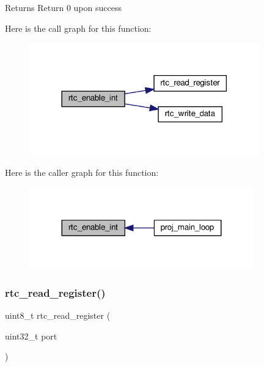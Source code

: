 \begin{DoxyReturn}{Returns}
Return 0 upon success 
\end{DoxyReturn}
Here is the call graph for this function\+:
\nopagebreak
\begin{figure}[H]
\begin{center}
\leavevmode
\includegraphics[width=282pt]{group__rtc_ga8d098a183fdb5fc38da0335041c4d3db_cgraph}
\end{center}
\end{figure}
Here is the caller graph for this function\+:
\nopagebreak
\begin{figure}[H]
\begin{center}
\leavevmode
\includegraphics[width=275pt]{group__rtc_ga8d098a183fdb5fc38da0335041c4d3db_icgraph}
\end{center}
\end{figure}
\mbox{\label{group__rtc_ga72153103ac037b1a162a9099f001b83c}} 
\subsubsection{\texorpdfstring{rtc\+\_\+read\+\_\+register()}{rtc\_read\_register()}}
{\footnotesize\ttfamily uint8\+\_\+t rtc\+\_\+read\+\_\+register (\begin{DoxyParamCaption}\item[{uint32\+\_\+t}]{port }\end{DoxyParamCaption})}



